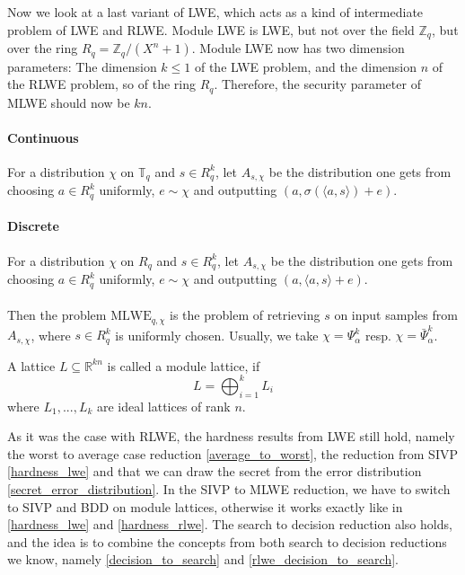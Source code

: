 \documentclass{report}
\newcommand{\T}{\mathbb{T}}
\newcommand{\Z}{\mathbb{Z}}
\newcommand{\R}{\mathbb{R}}
\begin{document}
Now we look at a last variant of LWE, which acts as a kind of intermediate problem of LWE and RLWE. Module LWE is LWE, but not over the field $\Z_q$, but over the ring $R_q = \Z_q/(X^n + 1)$. Module LWE now has two dimension parameters: The dimension $k \leq 1$ of the LWE problem, and the dimension $n$ of the RLWE problem, so of the ring $R_q$. Therefore, the security parameter of MLWE should now be $kn$.

\paragraph{Continuous} For a distribution $\chi$ on $\T_q$ and $s \in R_q^k$, let $A_{s, \chi}$ be the distribution one gets from choosing $a \in R_q^k$ uniformly, $e \sim \chi$ and outputting $(a, \sigma(\langle a, s \rangle) + e)$.

\paragraph{Discrete} For a distribution $\chi$ on $R_q$ and $s \in R_q^k$, let $A_{s, \chi}$ be the distribution one gets from choosing $a \in R_q^k$ uniformly, $e \sim \chi$ and outputting $(a, \langle a, s \rangle + e)$.
\\\\
Then the problem $\mathrm{MLWE}_{q, \chi}$ is the problem of retrieving $s$ on input samples from $A_{s, \chi}$, where $s \in R_q^k$ is uniformly chosen. Usually, we take $\chi = \Psi_\alpha^k$ resp. $\chi = \bar{\Psi}_\alpha^k$.

A lattice $L \subseteq \R^{kn}$ is called a module lattice, if 
\begin{equation}
L = \bigoplus_{i = 1}^k L_i \nonumber
\end{equation}
where $L_1, ..., L_k$ are ideal lattices of rank $n$.

As it was the case with RLWE, the hardness results from LWE still hold, namely the worst to average case reduction \ref{average_to_worst}, the reduction from SIVP \ref{hardness_lwe} and that we can draw the secret from the error distribution \ref{secret_error_distribution}. In the SIVP to MLWE reduction, we have to switch to SIVP and BDD on module lattices, otherwise it works exactly like in \ref{hardness_lwe} and \ref{hardness_rlwe}. The search to decision reduction also holds, and the idea is to combine the concepts from both search to decision reductions we know, namely \ref{decision_to_search} and \ref{rlwe_decision_to_search}.
\end{document}
